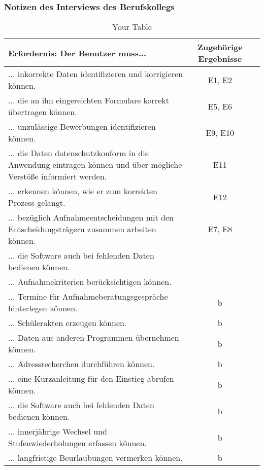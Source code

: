 \subsubsection{Notizen des Interviews des Berufskollegs}
\label{section-InterviewBerufskolleg}


\begin{landscape}

    \begin{longtable}{p{15cm}cc}
        \caption{Your Table} \label{tab:mytable} \\
        \toprule
        Erfordernis: Der Benutzer muss... & Zugehörige Ergebnisse \\
        \midrule
            ... inkorrekte Daten identifizieren und korrigieren können. & E1, E2 \\
            ... die an ihn eingereichten Formulare korrekt übertragen können. & E5, E6 \\
            ... unzulässige Bewerbungen identifizieren können. & E9, E10 \\
            ... die Daten datenschutzkonform in die Anwendung eintragen können und über mögliche Verstöße informiert werden. & E11 \\
            ... erkennen können, wie er zum korrekten Prozess gelangt. & E12 \\
            ... bezüglich Aufnahmeentscheidungen mit den Entscheidungsträgern zusammen arbeiten können. & E7, E8 \\
            ... die Software auch bei fehlenden Daten bedienen können.  & \\
            ... Aufnahmekriterien berücksichtigen können. & \\
            ... Termine für Aufnahmeberatungsgespräche hinterlegen können. & b \\
            ... Schülerakten erzeugen können. & b \\
            ... Daten aus anderen Programmen übernehmen können. & b \\
            ... Adressrecherchen durchführen können. & b \\
            ... eine Kurzanleitung für den Einstieg abrufen können. & b \\
            ... die Software auch bei fehlenden Daten bedienen können. & b \\
            ... innerjährige Wechsel und Stufenwiederholungen erfassen können. & b \\
            ... langfristige Beurlaubungen vermerken können. & b \\

\end{longtable}
\end{landscape}
